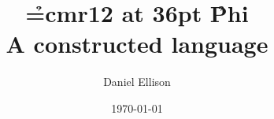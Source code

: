 \title{\font\h=cmr12 at 36pt \h Phi\\
\Large A constructed language}
\author{Daniel Ellison}
\date{\today}
\maketitle
